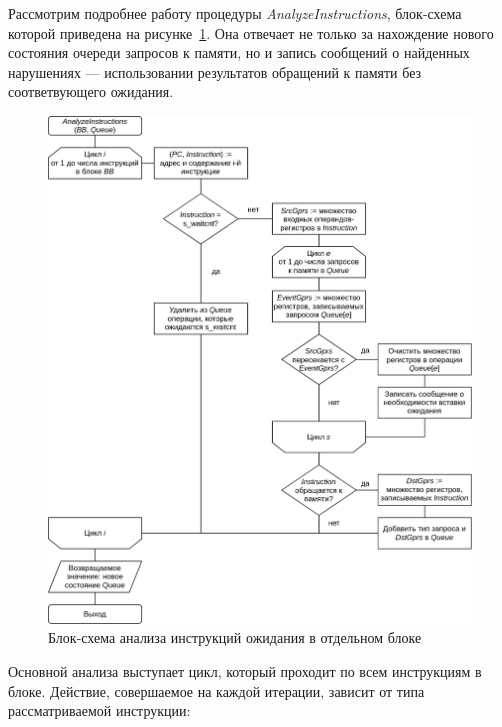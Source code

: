\documentclass[a4paper,14pt]{extarticle}
\begin{document}
Рассмотрим подробнее работу процедуры \textit{AnalyzeInstructions}, блок-схема которой приведена
на рисунке~\ref{fig:diagram-waitcnt-analyze}. Она отвечает не только за нахождение нового состояния
очереди запросов к памяти, но и запись сообщений о найденных нарушениях — использовании результатов
обращений к памяти без соответвующего ожидания.

\begin{figure}[H]
\centering
\includegraphics[width=\textwidth]{diagrams/alg-waitcnt-analyze}
\caption{Блок-схема анализа инструкций ожидания в отдельном блоке}
\label{fig:diagram-waitcnt-analyze}
\end{figure}

Основной анализа выступает цикл, который проходит по всем инструкциям в блоке. Действие, совершаемое
на каждой итерации, зависит от типа рассматриваемой инструкции:
\end{document}
